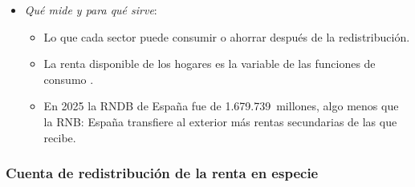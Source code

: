 \documentclass[11pt]{article}
\begin{document}
\begin{itemize}
\begin{itemize}
\begin{equation}
\mathrm{RNB}=\mathrm{PIB}+\mathrm{RP},\qquad \mathrm{RNDB}=\mathrm{RNB}+\mathrm{RS}=\mathrm{PIB}+\mathrm{RP}+\mathrm{RS}.
\end{equation}
  \end{itemize}
\item \emph{Qué mide y para qué sirve}:
  \begin{itemize}
  \item Lo que cada sector puede consumir o ahorrar después de la redistribución.
  \item La renta disponible de los hogares es la variable de las funciones de consumo .
  \item En 2025 la RNDB de España fue de 1.679.739~millones, algo menos que la RNB: España transfiere al exterior más rentas secundarias de las que recibe\nocite{Eurostat2026nasa10nftr}.
  \end{itemize}
\end{itemize}

\subsubsection{Cuenta de redistribución de la renta en especie}\label{sec:especie}
\end{document}
